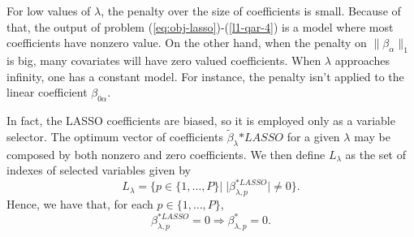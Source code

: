 
For low values of $\lambda$, the penalty over the size of coefficients is small. Because of that, the output of problem (\ref{eq:obj-lasso})-(\ref{l1-qar-4}) is a model where most coefficients have nonzero value. On the other hand, when the penalty on $\| \beta_\alpha \|_1$ is big, many covariates will have zero valued coefficients. When $\lambda$ approaches infinity, one has a constant model.  
For instance, the penalty isn't applied to the linear coefficient $\beta_{0\alpha}$. 

In fact, the LASSO coefficients are biased, so it is employed only as a variable selector. 
The optimum vector of coefficients $\tilde \beta_\lambda{*LASSO}$ for a given $\lambda$ may be composed by both nonzero and zero coefficients. 
We then define $L_\lambda$ as the set of indexes of selected variables given by
\begin{equation*}
L_\lambda = \{ p \in \{ 1,\dots,P \} | \; |\beta^{*LASSO}_{\lambda,p}| \neq 0  \}.
\end{equation*}
Hence, we have that, for each $p \in \{ 1,\dots,P \}$,
$$\beta^{*LASSO}_{\lambda,p} = 0 \Longrightarrow \beta^{*}_{\lambda,p} = 0.$$


